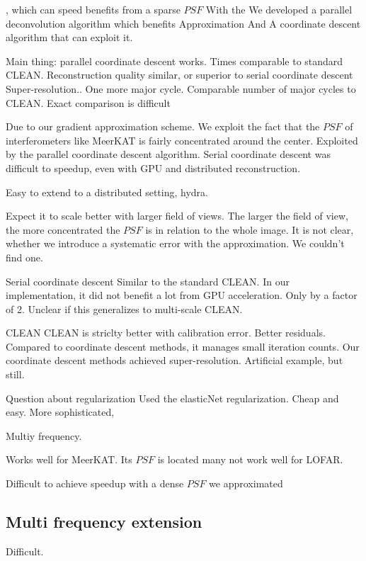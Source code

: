  , which can speed benefits from a sparse $PSF$ With the  We developed a parallel deconvolution algorithm which benefits
Approximation
And A coordinate descent algorithm that can  exploit it.

Main thing: parallel coordinate descent works.
Times comparable to standard CLEAN.
Reconstruction quality similar, or superior to serial coordinate descent
Super-resolution..
One more major cycle.
Comparable number of major cycles to CLEAN. Exact comparison is difficult

Due to our gradient approximation scheme. We exploit the fact that the $PSF$ of interferometers like MeerKAT is fairly concentrated around the center.
Exploited by the parallel coordinate descent algorithm. 
Serial coordinate descent was difficult to speedup, even with GPU and distributed reconstruction.

Easy to extend to a distributed setting, hydra.

Expect it to scale better with larger field of views. The larger the field of view, the more concentrated the $PSF$ is in relation to the whole image.
It is not clear, whether we introduce a systematic error with the approximation. We couldn't find one.

Serial coordinate descent
Similar to the standard CLEAN.
In our implementation, it did not benefit a lot from GPU acceleration. Only by a factor of 2. Unclear if this generalizes to multi-scale CLEAN.

CLEAN
CLEAN is striclty better with calibration error.
Better residuals. Compared to coordinate descent methods, it manages small iteration counts.
Our coordinate descent methods achieved super-resolution. Artificial example, but still.

Question about regularization
Used the elasticNet regularization. Cheap and easy. More sophisticated, 

Multiy frequency.



Works well for MeerKAT. Its $PSF$ is located many not work well for LOFAR.

Difficult to achieve speedup with a dense $PSF$ we approximated












\subsection{Multi frequency extension}\label{discussion:mfs}
Difficult.

